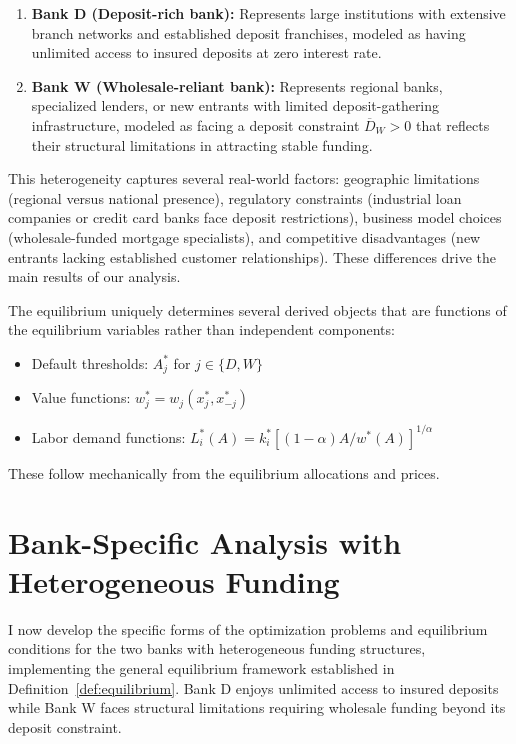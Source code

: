 \documentclass[12pt]{article}
\begin{document}
\begin{definition}
\begin{enumerate}
    \item \textbf{Bank D (Deposit-rich bank):} Represents large institutions with extensive branch networks and established deposit franchises, modeled as having unlimited access to insured deposits at zero interest rate.
    \item \textbf{Bank W (Wholesale-reliant bank):} Represents regional banks, specialized lenders, or new entrants with limited deposit-gathering infrastructure, modeled as facing a deposit constraint $\overline{D}_{W} > 0$ that reflects their structural limitations in attracting stable funding.
\end{enumerate}
\end{definition}

This heterogeneity captures several real-world factors: geographic limitations (regional versus national presence), regulatory constraints (industrial loan companies or credit card banks face deposit restrictions), business model choices (wholesale-funded mortgage specialists), and competitive disadvantages (new entrants lacking established customer relationships). These differences drive the main results of our analysis.

\begin{remark}
The equilibrium uniquely determines several derived objects that are functions of the equilibrium variables rather than independent components:
\begin{itemize}
    \item Default thresholds: $A_{j}^{*}$ for $j \in \{D, W\}$
    \item Value functions: $w_{j}^{*} = w_{j}(x_{j}^{*},x_{-j}^{*})$
    \item Labor demand functions: $L_{i}^{*}(A) = k_{i}^{*}[(1-\alpha)A/w^{*}(A)]^{1/\alpha}$
\end{itemize}
These follow mechanically from the equilibrium allocations and prices.
\end{remark}

\section{Bank-Specific Analysis with Heterogeneous Funding}
I now develop the specific forms of the optimization problems and equilibrium conditions for the two banks with heterogeneous funding structures, implementing the general equilibrium framework established in Definition~\ref{def:equilibrium}. Bank D enjoys unlimited access to insured deposits while Bank W faces structural limitations requiring wholesale funding beyond its deposit constraint.
\end{document}
